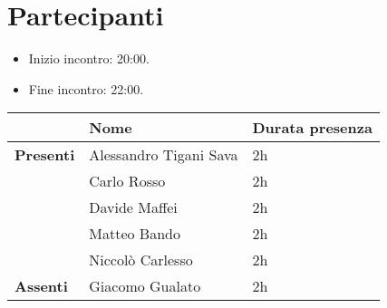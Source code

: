 \section{Partecipanti}

\begin{itemize}
	\item Inizio incontro: 20:00.
	\item Fine incontro: 22:00.
\end{itemize}


\begin{center}
	{\renewcommand{\arraystretch}{1.5}
		\begin{tabular}{lll}
			                  & \textbf{Nome}          & \textbf{Durata presenza} \\
			\hline
			\textbf{Presenti} & Alessandro Tigani Sava & 2h                       \\
			                  & Carlo Rosso            & 2h                       \\
			                  & Davide Maffei          & 2h                       \\
			                  & Matteo Bando           & 2h                       \\
			                  & Niccolò Carlesso       & 2h                       \\
			\hline
			\textbf{Assenti}  & Giacomo Gualato        & 2h                       \\
		\end{tabular}
	}
\end{center}
